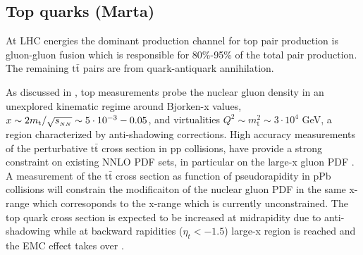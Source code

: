\subsection{Top quarks (Marta)}
At LHC energies the dominant production channel for top pair production is gluon-gluon fusion which is responsible for 80\%-95\% of the total pair production. The remaining $\mathrm{t}\bar{\mathrm{t}}$ pairs are from quark-antiquark annihilation. 

As discussed in \cite{d'Enterria:2015jna}, top measurements probe the nuclear gluon density in an unexplored kinematic regime around Bjorken-x values, $x \sim 2m_{\mathrm{t}}/\sqrt{s_{_{NN}}} \sim 5 \cdot 10^{-3}-0.05$, and virtualities $Q^{2} \sim m_{\mathrm{t}}^{2} \sim 3 \cdot 10^{4}$ GeV, a region characterized by anti-shadowing corrections. High accuracy measurements of the perturbative $\mathrm{t}\bar{\mathrm{t}}$ cross section in pp collisions, have provide a strong constraint on existing NNLO PDF sets, in particular on the large-x gluon PDF \cite{Czakon:2013tha}. A measurement of the $\mathrm{t}\bar{\mathrm{t}}$ cross section as function of pseudorapidity in pPb collisions will constrain the modificaiton of the nuclear gluon PDF in the same x-range which corresoponds to the x-range which is currently unconstrained. The top quark cross section is expected to be increased at midrapidity due to anti-shadowing while at backward rapidities ($\eta_{t}<-1.5$) large-x region is reached and the EMC effect takes over \cite{d'Enterria:2015jna}.

